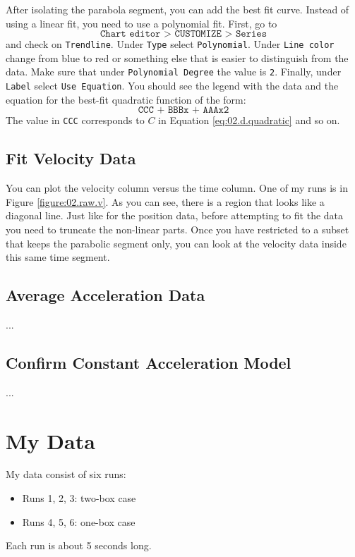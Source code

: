 After isolating the parabola segment, you can add the best fit curve. Instead of using a linear fit, you need to use a polynomial fit. First, go to
\begin{equation}
    \texttt{Chart editor > CUSTOMIZE > Series}
\end{equation}
and check on \texttt{Trendline}. Under \texttt{Type} select \texttt{Polynomial}. Under \texttt{Line color} change from blue to red or something else that is easier to distinguish from the data. Make sure that under \texttt{Polynomial Degree} the value is \texttt{2}. Finally, under \texttt{Label} select \texttt{Use Equation}. You should see the legend with the data and the equation for the best-fit quadratic function of the form:
\begin{equation}
    \texttt{CCC + BBBx + AAAx\^{}2}
\end{equation}
The value in \texttt{CCC} corresponds to $C$ in Equation \ref{eq:02.d.quadratic} and so on.
\subsection{Fit Velocity Data}
You can plot the velocity column versus the time column. One of my runs is in Figure \ref{figure:02.raw.v}. As you can see, there is a region that looks like a diagonal line. Just like for the position data, before attempting to fit the data you need to truncate the non-linear parts. Once you have restricted to a subset that keeps the parabolic segment only, you can look at the velocity data inside this same time segment.
\subsection{Average Acceleration Data}
...
\subsection{Confirm Constant Acceleration Model}
...
\section{My Data}
My data consist of six runs:
\begin{itemize}
    \item Runs 1, 2, 3: two-box case
    \item Runs 4, 5, 6: one-box case
\end{itemize}
Each run is about 5 seconds long.
